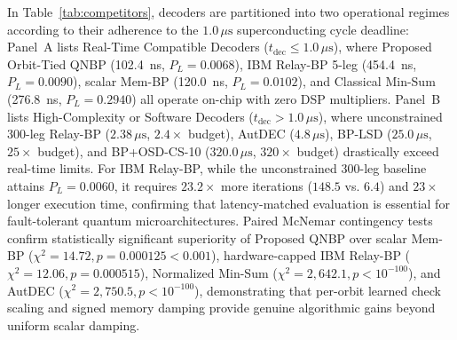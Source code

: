 \documentclass[journal]{IEEEtran}
\begin{document}
In Table~\ref{tab:competitors}, decoders are partitioned into two operational regimes according to their adherence to the $1.0\,\mu\text{s}$ superconducting cycle deadline: Panel~A lists Real-Time Compatible Decoders ($t_{\text{dec}} \le 1.0\,\mu\text{s}$), where Proposed Orbit-Tied QNBP (102.4~ns, $P_L = 0.0068$), IBM Relay-BP 5-leg (454.4~ns, $P_L = 0.0090$), scalar Mem-BP (120.0~ns, $P_L = 0.0102$), and Classical Min-Sum (276.8~ns, $P_L = 0.2940$) all operate on-chip with zero DSP multipliers. Panel~B lists High-Complexity or Software Decoders ($t_{\text{dec}} > 1.0\,\mu\text{s}$), where unconstrained 300-leg Relay-BP ($2.38\,\mu\text{s}$, $2.4\times$ budget), AutDEC ($4.8\,\mu\text{s}$), BP-LSD ($25.0\,\mu\text{s}$, $25\times$ budget), and BP+OSD-CS-10 ($320.0\,\mu\text{s}$, $320\times$ budget) drastically exceed real-time limits. For IBM Relay-BP, while the unconstrained 300-leg baseline attains $P_L = 0.0060$, it requires $23.2\times$ more iterations ($148.5$ vs. $6.4$) and $23\times$ longer execution time, confirming that latency-matched evaluation is essential for fault-tolerant quantum microarchitectures. Paired McNemar contingency tests~\cite{mcnemar1947note} confirm statistically significant superiority of Proposed QNBP over scalar Mem-BP ($\chi^2 = 14.72, p = 0.000125 < 0.001$), hardware-capped IBM Relay-BP ($\chi^2 = 12.06, p = 0.000515$), Normalized Min-Sum ($\chi^2 = 2,642.1, p < 10^{-100}$), and AutDEC ($\chi^2 = 2,750.5, p < 10^{-100}$), demonstrating that per-orbit learned check scaling and signed memory damping provide genuine algorithmic gains beyond uniform scalar damping.
\end{document}
